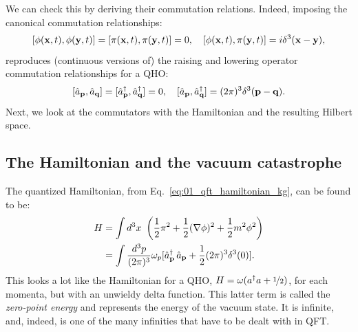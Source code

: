 We can check this by deriving their commutation relations.
Indeed, imposing the canonical commutation relationships:
\begin{equation}
	\label{eq:01_qft_quantization_fsf_commutators}
	[\phi(\mathbf{x}, t), \phi(\mathbf{y}, t)] = [\pi(\mathbf{x}, t), \pi(\mathbf{y}, t)] = 0, \quad [\phi(\mathbf{x}, t), \pi(\mathbf{y}, t)] = i\delta^3(\mathbf{x} - \mathbf{y}),
\end{equation}
reproduces (continuous versions of) the raising and lowering operator commutation relationships for a QHO:
\begin{equation}
	\label{eq:01_qft_quantization_fsf_commutators_qho}
	[\hat a_{\mathbf{p}}, \hat a_{\mathbf{q}}] = [\hat a^\dagger_{\mathbf{p}}, \hat a^\dagger_{\mathbf{q}}] = 0, \quad [\hat a_{\mathbf{p}}, \hat a^\dagger_{\mathbf{q}}] = (2\pi)^3\delta^3(\mathbf{p} - \mathbf{q}).
\end{equation}
Next, we look at the commutators with the Hamiltonian and the resulting Hilbert space.

\subsection{The Hamiltonian and the vacuum catastrophe}
\label{sec:01_qft_quantization_hamiltonian}

The quantized Hamiltonian, from Eq.~\ref{eq:01_qft_hamiltonian_kg}, can be found to be:
\begin{equation}
	\label{eq:01_qft_quantization_hamiltonian_zeropoint}
	\begin{split}
		H &= \int d^3x\ \left(\frac{1}{2}\pi^2 + \frac{1}{2}(\nabla\phi)^2 + \frac{1}{2}m^2\phi^2\right) \\
		&= \int \frac{d^3p}{(2\pi)^3} \omega_p [\hat a^\dagger_{\mathbf{p}}\,\hat a_{\mathbf{p}} + \frac{1}{2} (2\pi)^3\delta^3(0)].
	\end{split}
\end{equation}
This looks a lot like the Hamiltonian for a QHO, $H = \omega(a^\dagger a + \cnicefrac{1}{2})$, for each momenta, but with an unwieldy delta function.
This latter term is called the \textit{zero-point energy} and represents the energy of the vacuum state.
It is infinite, and, indeed, is one of the many infinities that have to be dealt with in QFT.

